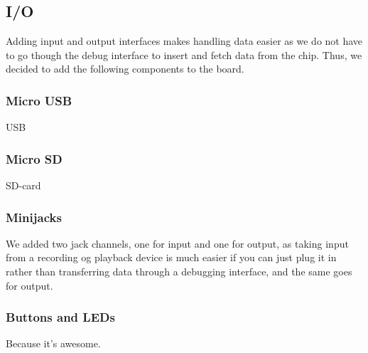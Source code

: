 \subsection{I/O}
Adding input and output interfaces makes handling data easier as we do not have to go though the debug interface to insert and fetch data from the chip. Thus, we decided to add the following components to the board.
\subsubsection{Micro USB}
USB 
\subsubsection{Micro SD}
SD-card 
\subsubsection{Minijacks}
We added two jack channels, one for input and one for output, as taking input from a recording og playback device is much easier if you can just plug it in rather than transferring data through a debugging interface, and the same goes for output.
\subsubsection{Buttons and LEDs}
Because it's awesome.